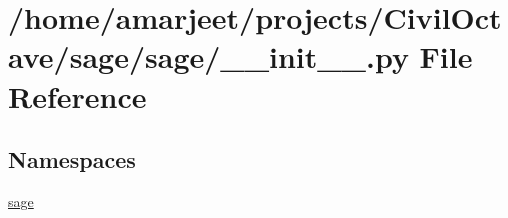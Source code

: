\hypertarget{a00011}{}\section{/home/amarjeet/projects/\+Civil\+Octave/sage/sage/\+\_\+\+\_\+init\+\_\+\+\_\+.py File Reference}
\label{a00011}
\subsection*{Namespaces}
\begin{DoxyCompactItemize}
\item 
 \hyperlink{a00041}{sage}
\end{DoxyCompactItemize}
